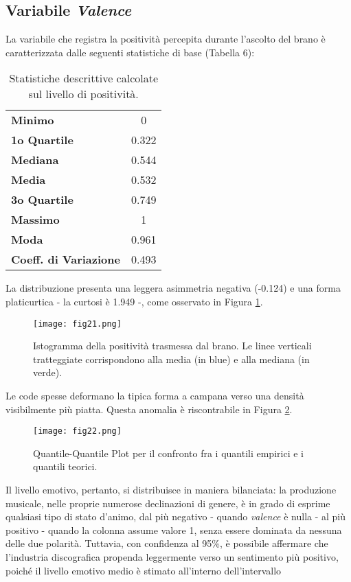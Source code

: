 \documentclass[fleqn,10pt]{SelfArx} %
\begin{document}
\subsection*{Variabile \textit{Valence}}
La variabile che registra la positività percepita durante l'ascolto del brano è caratterizzata dalle seguenti  statistiche di base (Tabella 6):
{\begin{table}[H]
\centering

\begin{tabular}[t]{lc}
\toprule
\midrule
\textbf{Minimo}&0\\
\textbf{1o Quartile}&0.322\\
\textbf{Mediana}&0.544\\
\textbf{Media}&0.532\\
\textbf{3o Quartile}&0.749\\
\textbf{Massimo}&1\\
\textbf{Moda}&0.961\\
\textbf{Coeff. di Variazione}&0.493\\
\bottomrule
\end{tabular}
\caption{Statistiche descrittive calcolate sul livello di positività.}
\end{table}}
La distribuzione presenta una leggera asimmetria negativa (-0.124) e una forma platicurtica - la curtosi è 1.949 -, come osservato in Figura \ref{fig:fig21}. 
\begin{figure}[H]
    \centering
    \texttt{[image: fig21.png]}
    \label{fig:fig21}
    \caption{Istogramma della positività trasmessa dal brano. Le linee verticali tratteggiate corrispondono alla media (in blue) e alla mediana (in verde).}
\end{figure}
Le code spesse deformano la tipica forma a campana verso una densità visibilmente più piatta. Questa anomalia è riscontrabile in Figura \ref{fig:fig22}.
\begin{figure}[H]
    \centering
    \texttt{[image: fig22.png]}
    \label{fig:fig22}
    \caption{Quantile-Quantile Plot per il confronto fra i quantili empirici e i quantili teorici.}
\end{figure}
Il livello emotivo, pertanto, si distribuisce in maniera bilanciata: la produzione musicale, nelle proprie numerose declinazioni di genere, è in grado di esprime qualsiasi tipo di stato d'animo, dal più negativo - quando \textit{valence} è nulla - al più positivo - quando la colonna assume valore 1, senza essere dominata da nessuna delle due polarità. Tuttavia, con confidenza al 95\%, è possibile affermare che l'industria discografica propenda leggermente verso un sentimento più positivo, poiché il livello emotivo medio è stimato all'interno dell'intervallo
\end{document}
